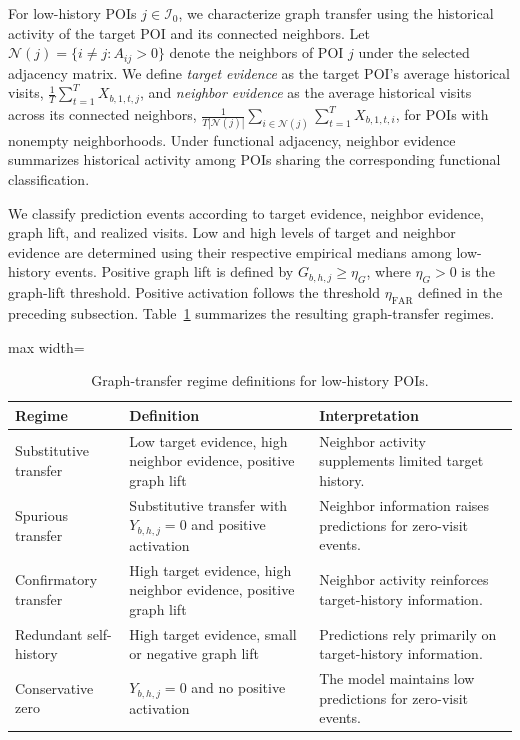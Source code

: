 \documentclass[preprint,authoryear,11pt]{elsarticle}
\theoremstyle{definition}
\begin{document}
For low-history POIs \(j\in\mathcal{I}_0\), we characterize graph transfer using the historical activity of the target POI and its connected neighbors.
Let \(\mathcal{N}(j)=\{i\neq j:A_{ij}>0\}\) denote the neighbors of POI \(j\) under the selected adjacency matrix.
We define \textit{target evidence} as the target POI's average historical visits,
\(\frac{1}{T}\sum_{t=1}^{T}X_{b,1,t,j}\),
and \textit{neighbor evidence} as the average historical visits across its connected neighbors,
\(\frac{1}{T|\mathcal{N}(j)|}\sum_{i\in\mathcal{N}(j)}\sum_{t=1}^{T}X_{b,1,t,i}\),
for POIs with nonempty neighborhoods.
Under functional adjacency, neighbor evidence summarizes historical activity among POIs sharing the corresponding functional classification.

We classify prediction events according to target evidence, neighbor evidence, graph lift, and realized visits.
Low and high levels of target and neighbor evidence are determined using their respective empirical medians among low-history events.
Positive graph lift is defined by \(G_{b,h,j}\geq\eta_G\), where \(\eta_G>0\) is the graph-lift threshold.
Positive activation follows the threshold \(\eta_{\mathrm{FAR}}\) defined in the preceding subsection.
Table~\ref{tab:graph_transfer_regime_definitions} summarizes the resulting graph-transfer regimes.

\begin{table}[t]
\centering
\begin{adjustbox}{max width=\textwidth}
\begin{tabular}{lll}
\toprule
Regime & Definition & Interpretation \\
\midrule
Substitutive transfer
& Low target evidence, high neighbor evidence, positive graph lift
& Neighbor activity supplements limited target history. \\
Spurious transfer
& Substitutive transfer with \(Y_{b,h,j}=0\) and positive activation
& Neighbor information raises predictions for zero-visit events. \\
Confirmatory transfer
& High target evidence, high neighbor evidence, positive graph lift
& Neighbor activity reinforces target-history information. \\
Redundant self-history
& High target evidence, small or negative graph lift
& Predictions rely primarily on target-history information. \\
Conservative zero
& \(Y_{b,h,j}=0\) and no positive activation
& The model maintains low predictions for zero-visit events. \\
\bottomrule
\end{tabular}
\end{adjustbox}
\caption{Graph-transfer regime definitions for low-history POIs.}
\label{tab:graph_transfer_regime_definitions}
\end{table}
\end{document}
